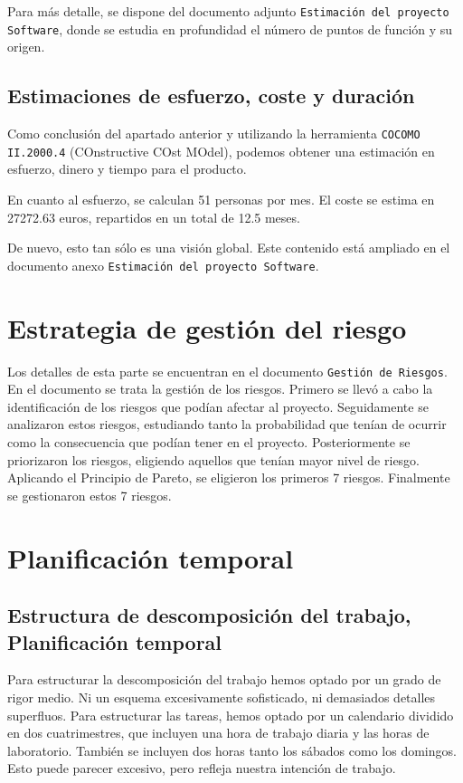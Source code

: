 \documentclass[spanish,a4paper,12pt]{report}	%
\begin{document}
		Para más detalle, se dispone del documento adjunto \texttt{Estimación del
		proyecto Software}, donde se estudia en profundidad el número de puntos de
		función y su origen.
\rhead{}
	\section{Estimaciones de esfuerzo, coste y duración}
		Como conclusión del apartado anterior y utilizando la herramienta \texttt{COCOMO II.2000.4} (COnstructive COst MOdel), podemos obtener una estimación en esfuerzo, dinero y tiempo para el producto.

		En cuanto al esfuerzo, se calculan 51 personas por mes. El coste se estima en 27272.63 euros, repartidos en un total de 12.5 meses.

		De nuevo, esto tan sólo es una visión global. Este contenido está ampliado en el
		documento anexo \texttt{Estimación del proyecto Software}.


\newpage
\mbox{}
\thispagestyle{empty}						%
\newpage
\setcounter{section}{0}
\chapter{Estrategia de gestión del riesgo}

	Los detalles de esta parte se encuentran en el documento \texttt{Gestión de Riesgos}.\\
	En el documento se trata la gestión de los riesgos. Primero se llevó a cabo la identificación de los riesgos que podían afectar al proyecto.
	Seguidamente se analizaron estos riesgos, estudiando tanto la probabilidad que tenían de ocurrir como la consecuencia que podían 
	tener en el proyecto. Posteriormente se priorizaron los riesgos, eligiendo aquellos que tenían mayor nivel de riesgo. Aplicando el Principio de Pareto, 
	se eligieron los primeros 7 riesgos.
	Finalmente se gestionaron estos 7 riesgos.

\newpage
\mbox{}
\thispagestyle{empty}						%
\newpage
\setcounter{section}{0}

\chapter{Planificación temporal}

	\section{Estructura de descomposición del trabajo, Planificación temporal}
	Para estructurar la descomposición del trabajo hemos optado por un grado de rigor medio. Ni un esquema excesivamente sofisticado, ni demasiados detalles superfluos. 
	Para estructurar las tareas, hemos optado por un calendario dividido en dos cuatrimestres, que incluyen una hora de trabajo diaria y las horas de laboratorio. También se incluyen dos 
	horas tanto los sábados como los domingos. Esto puede parecer excesivo, pero refleja nuestra intención de trabajo.
\end{document}

